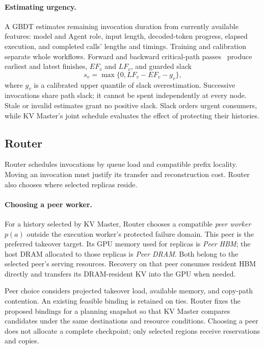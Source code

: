 \paragraph{Estimating urgency.}
A GBDT estimates remaining invocation duration from currently available
features: model and Agent role, input length, decoded-token progress,
elapsed execution, and completed calls' lengths and timings. Training
and calibration separate whole workflows. Forward and backward
critical-path passes~\cite{kelley1959cpm} produce earliest and latest
finishes, $EF_v$ and $LF_v$, and guarded slack
\begin{equation}
 s_v=\max\{0,LF_v-EF_v-g_v\},
 \label{eq:slack}
\end{equation}
where $g_v$ is a calibrated upper quantile of slack overestimation.
Successive invocations share path slack; it cannot be spent independently
at every node. Stale or invalid estimates grant no positive slack.
Slack orders urgent consumers, while KV Master's joint schedule evaluates
the effect of protecting their histories.

\subsection{Router}
\label{sec:router}

Router schedules invocations by queue load and compatible prefix
locality. Moving an invocation must justify its transfer and
reconstruction cost. Router also chooses where selected replicas reside.

\paragraph{Choosing a peer worker.}
For a history selected by KV Master, Router chooses a compatible
\emph{peer worker} $p(a)$ outside the execution worker's protected
failure domain. This peer is the preferred takeover target. Its GPU
memory used for replicas is \emph{Peer HBM}; the host DRAM allocated to
those replicas is \emph{Peer DRAM}. Both belong to the selected peer's
serving resources. Recovery on that peer consumes resident HBM directly
and transfers its DRAM-resident KV into the GPU when needed.

Peer choice considers projected takeover load, available memory, and
copy-path contention. An existing feasible binding is retained on ties.
Router fixes the proposed bindings for a planning snapshot so that KV
Master compares candidates under the same destinations and resource
conditions. Choosing a peer does not allocate a complete checkpoint;
only selected regions receive reservations and copies.

